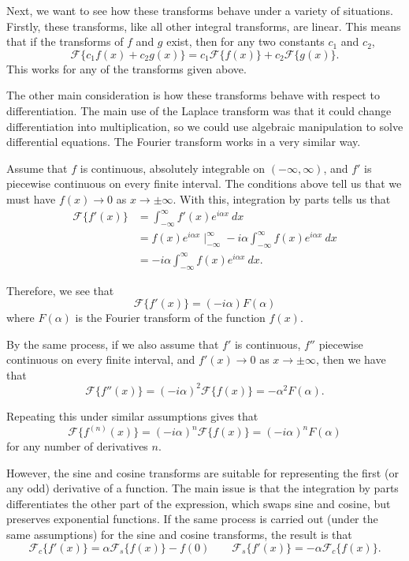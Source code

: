 \documentclass{ximera}
\begin{document}
Next, we want to see how these transforms behave under a variety of situations. Firstly, these transforms, like all other integral transforms, are linear. This means that if the transforms of $f$ and $g$ exist, then for any two constants $c_1$ and $c_2$, 
\[ 
    \mathcal{F}\{c_1f(x) + c_2g(x)\} = c_1\mathcal{F}\{f(x)\} + c_2 \mathcal{F}\{g(x)\}. 
\]
This works for any of the transforms given above.

The other main consideration is how these transforms behave with respect to differentiation. The main use of the Laplace transform was that it could change differentiation into multiplication, so we could use algebraic manipulation to solve differential equations. The Fourier transform works in a very similar way. 

Assume that $f$ is continuous, absolutely integrable on $(-\infty, \infty)$, and $f'$ is piecewise continuous on every finite interval. The conditions above tell us that we must have $f(x) \rightarrow 0$ as $x \rightarrow \pm \infty$. With this, integration by parts tells us that
\[ 
    \begin{split}
        \mathcal{F}\{f'(x)\} &= \int_{-\infty}^\infty f'(x)e^{i\alpha x}\ dx \\
        &= f(x)e^{i\alpha x} \mid_{-\infty}^\infty - i\alpha \int_{-\infty}^\infty f(x)e^{i\alpha x}\ dx \\
        &= -i\alpha \int_{-\infty}^\infty f(x)e^{i\alpha x}\ dx.
    \end{split}
\]

Therefore, we see that
\[ 
    \mathcal{F}\{f'(x)\} = (-i\alpha) F(\alpha) 
\] 
where $F(\alpha)$ is the Fourier transform of the function $f(x)$. 

By the same process, if we also assume that $f'$ is continuous, $f''$ piecewise continuous on every finite interval, and $f'(x) \rightarrow 0$ as $x \rightarrow \pm \infty$, then we have that
\[ 
    \mathcal{F}\{f''(x) \} = (-i\alpha)^2 \mathcal{F}\{f(x)\} = -\alpha^2 F(\alpha). 
\]

Repeating this under similar assumptions gives that
\[ 
    \mathcal{F}\{f^{(n)}(x) \} = (-i\alpha)^n \mathcal{F}\{f(x)\} = (-i\alpha)^n F(\alpha) 
\] 
for any number of derivatives $n$. 

However, the sine and cosine transforms are suitable for representing the first (or any odd) derivative of a function. The main issue is that the integration by parts differentiates the other part of the expression, which swaps sine and cosine, but preserves exponential functions. If the same process is carried out (under the same assumptions) for the sine and cosine transforms, the result is that
\[ 
    \mathcal{F}_c\{f'(x)\} = \alpha \mathcal{F}_s\{f(x)\} - f(0) \qquad \mathcal{F}_s\{f'(x)\} = -\alpha \mathcal{F}_c\{f(x)\}.
\] 
\end{document}
